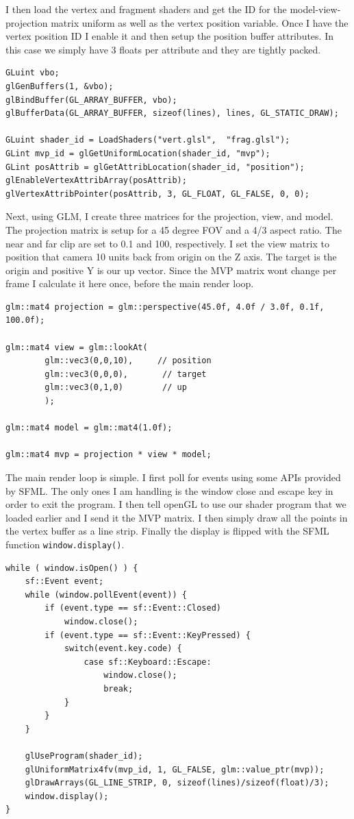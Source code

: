 \documentclass[12pt]{article}
\begin{document}
I then load the vertex and fragment shaders and get the ID for the
model-view-projection matrix uniform as well as the vertex position
variable.  Once I have the vertex position ID I enable it and then setup the
position buffer attributes.  In this case we simply have 3 floats per
attribute and they are tightly packed.

\begin{lstlisting}[caption=Setting up shaders]
GLuint vbo;
glGenBuffers(1, &vbo);
glBindBuffer(GL_ARRAY_BUFFER, vbo);
glBufferData(GL_ARRAY_BUFFER, sizeof(lines), lines, GL_STATIC_DRAW);

GLuint shader_id = LoadShaders("vert.glsl",  "frag.glsl");
GLint mvp_id = glGetUniformLocation(shader_id, "mvp");
GLint posAttrib = glGetAttribLocation(shader_id, "position");
glEnableVertexAttribArray(posAttrib);
glVertexAttribPointer(posAttrib, 3, GL_FLOAT, GL_FALSE, 0, 0);
\end{lstlisting}

Next, using GLM, I create three matrices for the projection, view, and model. The projection matrix
is setup for a 45 degree FOV and a 4/3 aspect ratio. The near and far clip are set to 0.1 and 100, respectively.
I set the view matrix to position that camera 10 units back from origin on the Z axis. The target is the origin
and positive Y is our up vector. Since the MVP matrix wont change per frame I calculate it here once, before the main render loop.

\begin{lstlisting}[caption=Matrix Setup]
glm::mat4 projection = glm::perspective(45.0f, 4.0f / 3.0f, 0.1f, 100.0f);

glm::mat4 view = glm::lookAt(
        glm::vec3(0,0,10),     // position
        glm::vec3(0,0,0),       // target
        glm::vec3(0,1,0)        // up
        );

glm::mat4 model = glm::mat4(1.0f);

glm::mat4 mvp = projection * view * model;
\end{lstlisting}

The main render loop is simple. I first poll for events using some APIs
provided by SFML. The only ones I am handling is the window close and escape
key in order to exit the program. I then tell openGL to use our shader
program that we loaded earlier and I send it the MVP matrix. I then simply
draw all the points in the vertex buffer as a line strip. Finally the
display is flipped with the SFML function \texttt{window.display()}.

\begin{lstlisting}[caption=Render Loop]
while ( window.isOpen() ) {
    sf::Event event;
    while (window.pollEvent(event)) {
        if (event.type == sf::Event::Closed)
            window.close();
        if (event.type == sf::Event::KeyPressed) {
            switch(event.key.code) {
                case sf::Keyboard::Escape:
                    window.close();
                    break;
            }
        }
    }

    glUseProgram(shader_id);
    glUniformMatrix4fv(mvp_id, 1, GL_FALSE, glm::value_ptr(mvp));
    glDrawArrays(GL_LINE_STRIP, 0, sizeof(lines)/sizeof(float)/3);
    window.display();
}
\end{lstlisting}
\end{document}

